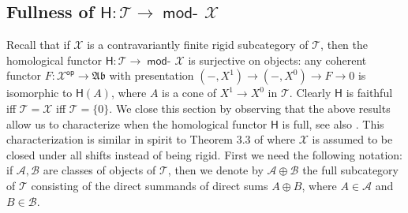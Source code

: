 \documentclass[oneside, a4paper,reqno]{amsart}
\numberwithin{equation}{section}
\theoremstyle{definition}
\begin{document}
\subsection{Fullness of $\mathsf{H} \colon {\mathcal T} {\longrightarrow} \operatorname*{\mathsf{mod}-\!}{\mathcal X}$} Recall that if ${\mathcal X}$ is a contravariantly finite rigid subcategory of ${\mathcal T}$, then the homological functor $\mathsf{H} \colon {\mathcal T} {\longrightarrow} \operatorname*{\mathsf{mod}-\!}{\mathcal X}$ is surjective on objects: any coherent functor $F \colon {\mathcal X}^\operatorname*{\mathsf{op}} {\longrightarrow} {\mathfrak{Ab}}$ with presentation $(-,X^{1}) {\longrightarrow} (-,X^{0}) {\longrightarrow} F {\longrightarrow} 0$ is isomorphic to $\mathsf{H}(A)$, where $A$ is a cone of $X^{1} {\longrightarrow} X^{0}$ in ${\mathcal T}$. Clearly $\mathsf{H}$ is faithful iff ${\mathcal T} = {\mathcal X}$ iff ${\mathcal T} = \{0\}$. We close this section by observing that the above results allow us to characterize when the homological functor $\mathsf{H}$ is full, see also \cite{B}.  This characterization is similar in spirit to Theorem $3.3$ of \cite{BK} where ${\mathcal X}$ is assumed to be closed under all shifts instead of being rigid.   First we need the following notation:  if ${\mathscr A}, {\mathscr B}$ are classes of objects of ${\mathcal T}$, then we denote by ${\mathscr A} \oplus {\mathscr B}$ the full subcategory of ${\mathcal T}$ consisting of the direct summands of direct sums $A \oplus B$, where $A \in {\mathscr A}$ and $B \in {\mathscr B}$.
\end{document}
